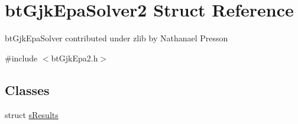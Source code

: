\hypertarget{structbt_gjk_epa_solver2}{\section{bt\+Gjk\+Epa\+Solver2 Struct Reference}
\label{structbt_gjk_epa_solver2}
}


bt\+Gjk\+Epa\+Solver contributed under zlib by Nathanael Presson  




{\ttfamily \#include $<$bt\+Gjk\+Epa2.\+h$>$}

\subsection*{Classes}
\begin{DoxyCompactItemize}
\item 
struct \hyperlink{structbt_gjk_epa_solver2_1_1s_results}{s\+Results}
\end{DoxyCompactItemize}
